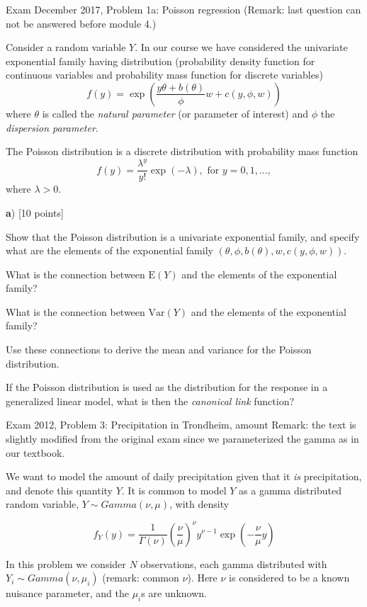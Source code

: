 \documentclass[
  ignorenonframetext,
]{beamer}
\begin{document}
\begin{frame}
\begin{block}{Exam December 2017, Problem 1a: Poisson regression}
\protect\hypertarget{exam-december-2017-problem-1a-poisson-regression}{}
(Remark: last question can not be answered before module 4.)

Consider a random variable \(Y\). In our course we have considered the
univariate exponential family having distribution (probability density
function for continuous variables and probability mass function for
discrete variables)
\[ f(y)=\exp(\frac{y \theta +b(\theta)}{\phi}w + c(y,\phi,w))\] where
\(\theta\) is called the \emph{natural parameter} (or parameter of
interest) and \(\phi\) the \emph{dispersion parameter}.

The Poisson distribution is a discrete distribution with probability
mass function
\[ f(y)=\frac{\lambda^{y}}{y!}\exp(- \lambda), \text{ for } y=0,1,...,\]
where \(\lambda>0\).
\end{block}
\end{frame}

\begin{frame}
\textbf{a}) {[}10 points{]}

Show that the Poisson distribution is a univariate exponential family,
and specify what are the elements of the exponential family
\((\theta,\phi,b(\theta),w,c(y,\phi,w))\).

What is the connection between \(\text{E}(Y)\) and the elements of the
exponential family?

What is the connection between \(\text{Var}(Y)\) and the elements of the
exponential family?

Use these connections to derive the mean and variance for the Poisson
distribution.

If the Poisson distribution is used as the distribution for the response
in a generalized linear model, what is then the \emph{canonical link}
function?
\end{frame}

\begin{frame}
\begin{block}{Exam 2012, Problem 3: Precipitation in Trondheim, amount}
\protect\hypertarget{exam-2012-problem-3-precipitation-in-trondheim-amount}{}
Remark: the text is slightly modified from the original exam since we
parameterized the gamma as in our textbook.

We want to model the amount of daily precipitation given that it
\emph{is} precipitation, and denote this quantity \(Y\). It is common to
model \(Y\) as a gamma distributed random variable,
\(Y \sim Gamma(\nu,\mu)\), with density

\[ f_Y(y) = \frac{1}{\Gamma(\nu)} \left(\frac{\nu}{\mu}\right)^{\nu} y^{\nu-1}\exp\left(-\frac{\nu}{\mu} y \right) \]

In this problem we consider \(N\) observations, each gamma distributed
with \(Y_i \sim Gamma(\nu, \mu_i)\) (remark: common \(\nu\)). Here
\(\nu\) is considered to be a known nuisance parameter, and the
\(\mu_i\)s are unknown.
\end{block}
\end{frame}
\end{document}
